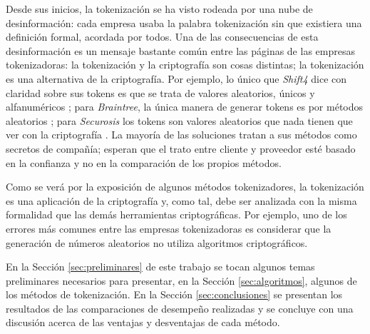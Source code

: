 
Desde sus inicios, la tokenización se ha visto rodeada por una nube de
desinformación: cada empresa usaba la palabra tokenización sin que existiera una
definición formal, acordada por todos. Una de las consecuencias de esta
desinformación es un mensaje bastante común entre las páginas de las empresas
tokenizadoras: la tokenización y la criptografía son cosas distintas; la
tokenización es una alternativa de la criptografía. Por ejemplo, lo único que
\textit{Shift4} dice con claridad sobre sus tokens es que se trata de valores
aleatorios, únicos y alfanuméricos \cite{shif4_uno}; para
\textit{Braintree}, la única manera de generar tokens es por métodos aleatorios
\cite{braintree_uno}; para \textit{Securosis} los tokens son valores aleatorios
que nada tienen que ver con la criptografía \cite{securosis}. La mayoría de las
soluciones tratan a sus métodos como secretos de compañía; esperan que el trato
entre cliente y proveedor esté basado en la confianza y no en la comparación de
los propios métodos.


Como se verá por la exposición de algunos métodos tokenizadores, la tokenización
es una aplicación de la criptografía y, como tal, debe ser analizada con la
misma formalidad que las demás herramientas criptográficas. Por ejemplo, uno de
los errores más comunes entre las empresas tokenizadoras es considerar que la
generación de números aleatorios no utiliza algoritmos criptográficos.


En la Sección \ref{sec:preliminares} de este trabajo se tocan algunos temas
preliminares necesarios para presentar, en la Sección \ref{sec:algoritmos},
algunos de los métodos de tokenización. En la Sección \ref{sec:conclusiones} se
presentan los resultados de las comparaciones de desempeño realizadas y se
concluye con una discusión acerca de las ventajas y desventajas de cada método.


